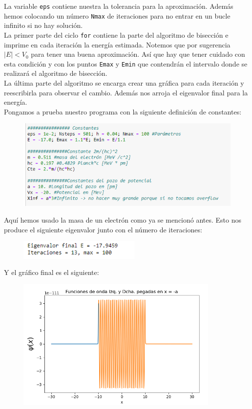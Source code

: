 \documentclass[11pt]{article}
\begin{document}
 	La variable \texttt{eps} contiene nuestra la tolerancia para la aproximación. Además hemos colocando un número \texttt{Nmax} de iteraciones para no entrar en un bucle infinito si no hay solución. \\
 	La primer parte  del ciclo \texttt{for} contiene la parte del algoritmo de bisección e imprime en cada iteración la energía estimada. Notemos que por sugerencia $|E|< V_0$ para tener una buena aproximación. Así que hay que tener cuidado con esta condición y con los puntos \texttt{Emax} y \texttt{Emin} que contendrán el intervalo donde se realizará el algoritmo de bisección.\\
 	La última parte del algoritmo se encarga crear una gráfica para cada iteración y reescribirla para observar el cambio. Además nos arroja el eigenvalor final para la energía.\\
 	Pongamos a prueba nuestro programa con la siguiente definición de constantes:
 	\begin{figure}[h]
 		\centering
 		\includegraphics[width=12cm]{Img/2.13.PNG}
 	\end{figure}
 
	Aquí hemos usado la masa de un electrón como ya se mencionó antes. Esto nos produce el siguiente eigenvalor junto con el número de iteraciones:
	\begin{figure}[h]
		\centering
		\includegraphics[width=6cm]{Img/2.12.PNG}
	\end{figure}
	
	Y el gráfico final es el siguiente:
	
	\begin{figure}[h]
		\centering
		\includegraphics[width=10cm]{Img/2.14.PNG}
	\end{figure}
\end{document}
